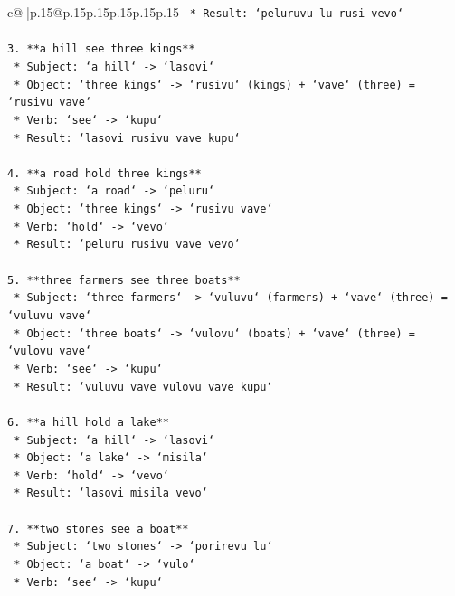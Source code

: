 \documentclass{article}
\begin{document}
{\begin{supertabular}{c@{$\;$}|p{.15\linewidth}@{}p{.15\linewidth}p{.15\linewidth}p{.15\linewidth}p{.15\linewidth}p{.15\linewidth}}
{{{\texttt{    *   Result: `peluruvu lu rusi vevo`} \\
\\ 
\texttt{3.  **a hill see three kings**} \\
\texttt{    *   Subject: `a hill` {-}> `lasovi`} \\
\texttt{    *   Object: `three kings` {-}> `rusivu` (kings) + `vave` (three) = `rusivu vave`} \\
\texttt{    *   Verb: `see` {-}> `kupu`} \\
\texttt{    *   Result: `lasovi rusivu vave kupu`} \\
\\ 
\texttt{4.  **a road hold three kings**} \\
\texttt{    *   Subject: `a road` {-}> `peluru`} \\
\texttt{    *   Object: `three kings` {-}> `rusivu vave`} \\
\texttt{    *   Verb: `hold` {-}> `vevo`} \\
\texttt{    *   Result: `peluru rusivu vave vevo`} \\
\\ 
\texttt{5.  **three farmers see three boats**} \\
\texttt{    *   Subject: `three farmers` {-}> `vuluvu` (farmers) + `vave` (three) = `vuluvu vave`} \\
\texttt{    *   Object: `three boats` {-}> `vulovu` (boats) + `vave` (three) = `vulovu vave`} \\
\texttt{    *   Verb: `see` {-}> `kupu`} \\
\texttt{    *   Result: `vuluvu vave vulovu vave kupu`} \\
\\ 
\texttt{6.  **a hill hold a lake**} \\
\texttt{    *   Subject: `a hill` {-}> `lasovi`} \\
\texttt{    *   Object: `a lake` {-}> `misila`} \\
\texttt{    *   Verb: `hold` {-}> `vevo`} \\
\texttt{    *   Result: `lasovi misila vevo`} \\
\\ 
\texttt{7.  **two stones see a boat**} \\
\texttt{    *   Subject: `two stones` {-}> `porirevu lu`} \\
\texttt{    *   Object: `a boat` {-}> `vulo`} \\
\texttt{    *   Verb: `see` {-}> `kupu`} \\
}}}
\end{supertabular}}
\end{document}
